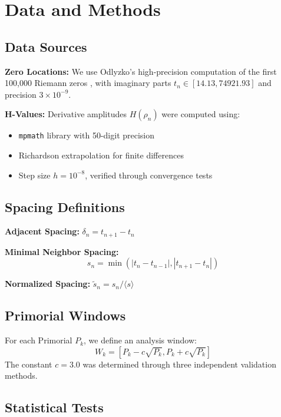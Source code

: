\documentclass[12pt]{article}
\begin{document}
\section{Data and Methods}

\subsection{Data Sources}

\textbf{Zero Locations:} We use Odlyzko's high-precision computation
of the first 100,000 Riemann zeros \cite{Odlyzko1987}, with imaginary
parts $t_n \in [14.13, 74921.93]$ and precision $3 \times 10^{-9}$.

\textbf{H-Values:} Derivative amplitudes $H(\rho_n)$ were computed using:

\begin{itemize}
\item \texttt{mpmath} library with 50-digit precision
\item Richardson extrapolation for finite differences
\item Step size $h = 10^{-8}$, verified through convergence tests
\end{itemize}

\subsection{Spacing Definitions}

\textbf{Adjacent Spacing:} $\delta_n = t_{n+1} - t_n$

\textbf{Minimal Neighbor Spacing:}
%
\begin{equation}
s_n = \min(|t_n - t_{n-1}|, |t_{n+1} - t_n|)
\end{equation}

\textbf{Normalized Spacing:} $\tilde{s}_n = s_n / \langle s \rangle$

\subsection{Primorial Windows}

For each Primorial $P_k$, we define an analysis window:
%
\begin{equation}
W_k = [P_k - c\sqrt{P_k}, P_k + c\sqrt{P_k}]
\end{equation}
%
The constant $c = 3.0$ was determined through three independent validation methods.

\subsection{Statistical Tests}
\end{document}
